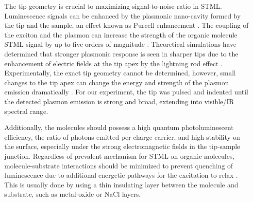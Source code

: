 The tip geometry is crucial to maximizing signal-to-noise ratio in \ac{STML}. Luminescence signals can be enhanced by the plasmonic nano-cavity formed by the tip and the sample, an effect known as Purcell enhancement \citep{purcell1946spontaneous}. The coupling of the exciton and the plasmon can increase the strength of the organic molecule \ac{STML} signal by up to five orders of magnitude \citep{chen2015molecular}. Theoretical simulations have determined that stronger plasmonic response is seen in sharper tips due to the enhancement of electric fields at the tip apex by the lightning rod effect \citep{novotny2012principles, aizpurua2000role}. Experimentally, the exact tip geometry cannot be determined, however, small changes to the tip apex can change the energy and strength of the plasmon emission dramatically \citep{meguro2002origin}. For our experiment, the tip was pulsed and indented until the detected plasmon emission is strong and broad, extending into visible/IR spectral range. 

Additionally, the molecules should possess a high quantum photoluminescent efficiency, the ratio of photons emitted per charge carrier, and high stability on the surface, especially under the strong electromagnetic fields in the tip-sample junction. Regardless of prevalent mechanism for \ac{STML} on organic molecules, molecule-substrate interactions should be minimized to prevent quenching of luminescence due to additional energetic pathways for the excitation to relax \citep{kuhnke2017atomic, rossel2010fluorescence}. This is usually done by using a thin insulating layer between the molecule and substrate, such as metal-oxide or NaCl layers. 









\endinput








\subsection{garbage}
\begin{equation}
    I_t \propto e^{-2kz},
\end{equation}

where $k$ is 

Has proven to be powerful in understanding the topological and electronic features of surfaces near the atomic level. 


